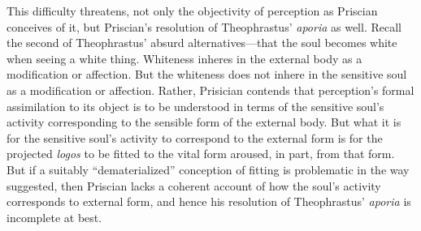 \documentclass[12pt]{article}
\begin{document}
This difficulty threatens, not only the objectivity of perception as Priscian conceives of it, but Priscian's resolution of Theophrastus' \emph{aporia} as well. Recall the second of Theophrastus' absurd alternatives---that the soul becomes white when seeing a white thing. Whiteness inheres in the external body as a modification or affection. But the whiteness does not inhere in the sensitive soul as a modification or affection. Rather, Prisician contends that perception's formal assimilation to its object is to be understood in terms of the sensitive soul's activity corresponding to the sensible form of the external body. But what it is for the sensitive soul's activity to correspond to the external form is for the projected \emph{logos} to be fitted to the vital form aroused, in part, from that form. But if a suitably ``dematerialized'' conception of fitting is problematic in the way suggested, then Priscian lacks a coherent account of how the soul's activity corresponds to external form, and hence his resolution of Theophrastus' \emph{aporia} is incomplete at best.






\end{document}

